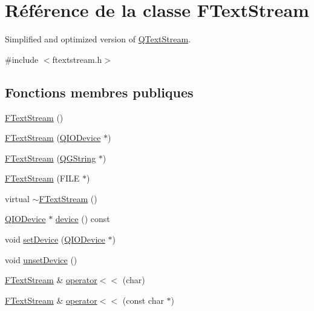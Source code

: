 \hypertarget{class_f_text_stream}{}\section{Référence de la classe F\+Text\+Stream}
\label{class_f_text_stream}


Simplified and optimized version of \hyperlink{class_q_text_stream}{Q\+Text\+Stream}.  




{\ttfamily \#include $<$ftextstream.\+h$>$}

\subsection*{Fonctions membres publiques}
\begin{DoxyCompactItemize}
\item 
\hyperlink{class_f_text_stream_a612e69bc2d0f44fd5bb8a56bffb5e16d}{F\+Text\+Stream} ()
\item 
\hyperlink{class_f_text_stream_a5da2a94e578da2d6a437e5896d04cee2}{F\+Text\+Stream} (\hyperlink{class_q_i_o_device}{Q\+I\+O\+Device} $\ast$)
\item 
\hyperlink{class_f_text_stream_ae5e845f418c192c691b4f56597aa646c}{F\+Text\+Stream} (\hyperlink{class_q_g_string}{Q\+G\+String} $\ast$)
\item 
\hyperlink{class_f_text_stream_aab7ddc66484e8fc42811c9013b2ac302}{F\+Text\+Stream} (F\+I\+L\+E $\ast$)
\item 
virtual \hyperlink{class_f_text_stream_a87f8684e712e4e57cdc26ce5fcac0b2f}{$\sim$\+F\+Text\+Stream} ()
\item 
\hyperlink{class_q_i_o_device}{Q\+I\+O\+Device} $\ast$ \hyperlink{class_f_text_stream_ab4c1bc07061c273ab9f750c757195cec}{device} () const 
\item 
void \hyperlink{class_f_text_stream_a1a90f7e23853f2b9f8a7e5470b1e0a30}{set\+Device} (\hyperlink{class_q_i_o_device}{Q\+I\+O\+Device} $\ast$)
\item 
void \hyperlink{class_f_text_stream_a284a01c6b372c3a718c29ea35b829097}{unset\+Device} ()
\item 
\hyperlink{class_f_text_stream}{F\+Text\+Stream} \& \hyperlink{class_f_text_stream_a1d87a0c4e6838fff7beb42b06f34f71b}{operator$<$$<$} (char)
\item 
\hyperlink{class_f_text_stream}{F\+Text\+Stream} \& \hyperlink{class_f_text_stream_a930047bc97078e2c98a786fe5c244c77}{operator$<$$<$} (const char $\ast$)
\item 

\end{DoxyCompactItemize}
